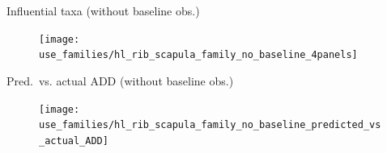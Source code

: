 \documentclass{beamer}
\begin{document}
\begin{frame}{Influential taxa (without baseline obs.)}

  \begin{center}
    \begin{figure}
      \texttt{[image: use\_families/hl\_rib\_scapula\_family\_no\_baseline\_4panels]}
    \end{figure}
  \end{center}

\end{frame}


\begin{frame}{Pred.\ vs. actual ADD (without baseline obs.)}

  \begin{center}
    \begin{figure}
      \texttt{[image: use\_families/hl\_rib\_scapula\_family\_no\_baseline\_predicted\_vs\_actual\_ADD]}
    \end{figure}
  \end{center}

\end{frame}

\end{document}
